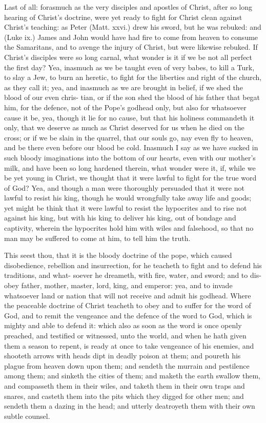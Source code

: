\documentclass{custom}
\begin{document}
Last of all: forasmuch as the very disciples and apostles 
of Christ, after so long hearing of Christ's doctrine, were 
yet ready to fight for Christ clean against Christ's teaching:
as Peter (Matt. xxvi.) drew his sword, but he was rebuked:
and (Luke ix.) James and John would have had fire to 
come from heaven to consume the Samaritans, and to 
avenge the injury of Christ, but were likewise rebuked. If 
Christ's disciples were so long carnal, what wonder is it if 
we be not all perfect the first day? Yea, inasmuch as we 
be taught even of very babes, to kill a Turk, to slay a Jew, 
to burn an heretic, to fight for the liberties and right of 
the church, as they call it; yea, and inasmuch as we are 
brought in belief, if we shed the blood of our even chris- 
tian, or if the son shed the blood of his father that begat him, 
for the defence, not of the Pope's godhead only, but also 
for whatsoever cause it be, yea, though it lie for no cause, 
but that his holiness commandeth it only, that we deserve 
as much as Christ deserved for us when he died on the 
cross; or if we be slain in the quarrel, that our souls go, 
nay even fly to heaven, and be there even before our blood 
be cold. Inasmuch I say as we have sucked in such bloody 
imaginations into the bottom of our hearts, even with our 
mother's milk, and have been so long hardened therein, 
what wonder were it, if, while we be yet young in Christ, 
we thought that it were lawful to fight for the true word of 
God? Yea, and though a man were thoroughly persuaded 
that it were not lawful to resist his king, though he would 
wrongfully take away life and goods; yet might be think 
that it were lawful to resist the hypocrites and to rise not 
against his king, but with his king to deliver his king, out 
of bondage and captivity, wherein the hypocrites hold him 
with wiles and falsehood, so that no man may be suffered 
to come at him, to tell him the truth. 

This seest thou, that it is the bloody doctrine of the pope, 
which caused disobedience, rebellion and insurrection, for 
he teacheth to fight and to defend his traditions, and what- 
soever he dreameth, with fire, water, and sword; and to dis- 
obey father, mother, master, lord, king, and emperor: yea, 
and to invade whatsoever land or nation that will not receive 
and admit his godhead. Where the peaceable doctrine of 
Christ teacheth to obey and to suffer for the word of God, 
and to remit the vengeance and the defence of the word to 
God, which is mighty and able to defend it: which also as 
soon as the word is once openly preached, and testified or 
witnessed, unto the world, and when he hath given them a 
season to repent, is ready at once to take vengeance of his 
enemies, and shooteth arrows with heads dipt in deadly 
poison at them; and poureth his plague from heaven down 
upon them; and sendeth the murrain and pestilence among 
them; and sinketh the cities of them; and maketh the earth 
swallow them, and compasseth them in their wiles, and 
taketh them in their own traps and snares, and casteth 
them into the pits which they digged for other men; and
sendeth them a dazing in the head; and utterly deatroyeth
them with their own subtle counsel.
\end{document}
